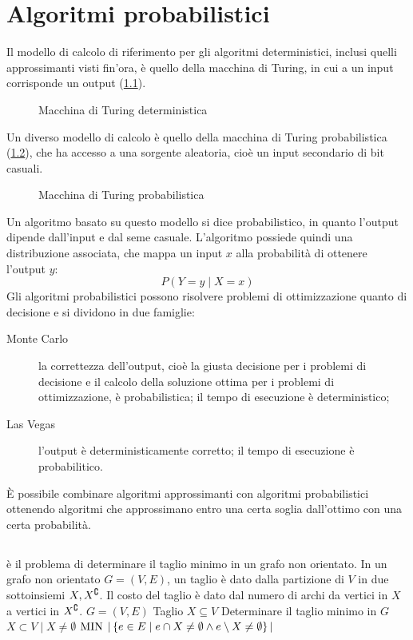 \chapter{Algoritmi probabilistici}
Il modello di calcolo di riferimento per gli algoritmi deterministici, inclusi quelli approssimanti visti fin'ora, è quello della macchina di Turing, in cui a un input corrisponde un output (\cref{fig:mdtdet}).
\begin{figure}[ht]
	\centering
	
	\caption{Macchina di Turing deterministica}
	\label{fig:mdtdet}
\end{figure}

Un diverso modello di calcolo è quello della macchina di Turing probabilistica (\cref{fig:mdtprob}), che ha accesso a una sorgente aleatoria, cioè un input secondario di bit casuali.

\begin{figure}[ht]
	\centering
	
	\caption{Macchina di Turing probabilistica}
	\label{fig:mdtprob}
\end{figure}

Un algoritmo basato su questo modello si dice probabilistico, in quanto l'output dipende dall'input e dal seme casuale.
L'algoritmo possiede quindi una distribuzione associata, che mappa un input $x$ alla probabilità di ottenere l'output $y$:
\begin{equation*}
	P(Y = y \mid X = x)
\end{equation*}
Gli algoritmi probabilistici possono risolvere problemi di ottimizzazione quanto di decisione e si dividono in due famiglie:
\begin{description}
	\item[Monte Carlo] la correttezza dell'output, cioè la giusta decisione per i problemi di decisione e il calcolo della soluzione ottima per i problemi di ottimizzazione, è probabilistica; il tempo di esecuzione è deterministico;
	\item[Las Vegas] l'output è deterministicamente corretto; il tempo di esecuzione è probabilitico.
\end{description}
È possibile combinare algoritmi approssimanti con algoritmi probabilistici ottenendo algoritmi che approssimano entro una certa soglia dall'ottimo con una certa probabilità.



\section{\MinCut}
\MinCut è il problema di determinare il taglio minimo in un grafo non orientato. In un grafo non orientato $G=(V,E)$, un taglio è dato dalla partizione di $V$ in due sottoinsiemi $X, X^\complement$. Il costo del taglio è dato dal numero di archi da vertici in $X$ a vertici in $X^\complement$.
\popt{\MinCut}
{$G = (V,E)$}
{Taglio $X\subseteq V$}
{Determinare il taglio minimo in $G$}
{$X\subset V\mid X\neq\emptyset$}
{$\mathrm{MIN}$}
{$| \left\{ e\in E\mid e\cap X\neq\emptyset\land e\setminus X\neq\emptyset \right\} |$}

